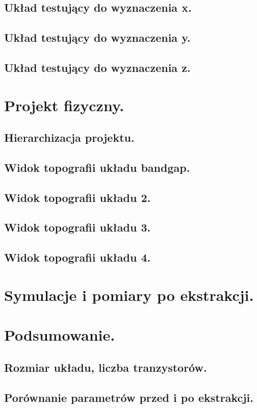 \documentclass[10pt,a4paper]{report}
\begin{document}
	\section{Układ testujący do wyznaczenia x.}
	\section{Układ testujący do wyznaczenia y.}
	\section{Układ testujący do wyznaczenia z.}
	
	\chapter{Projekt fizyczny.}
	\section{Hierarchizacja projektu.}
	\section{Widok topografii układu bandgap.}
	\section{Widok topografii układu 2.}
	\section{Widok topografii układu 3.}
	\section{Widok topografii układu 4.}
	
	\chapter{Symulacje i pomiary po ekstrakcji.}
	
	\chapter{Podsumowanie.}
	\section{Rozmiar układu, liczba tranzystorów.}
	\section{Porównanie parametrów przed i po ekstrakcji.}
\end{document}
